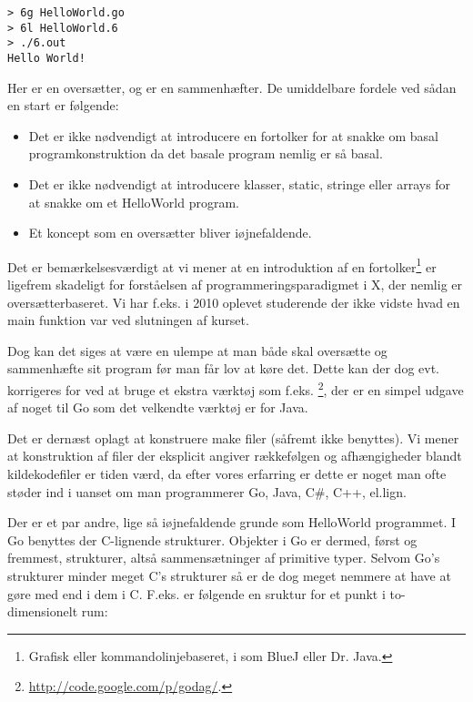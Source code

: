 \begin{verbatim}
> 6g HelloWorld.go
> 6l HelloWorld.6
> ./6.out
Hello World!
\end{verbatim}

Her er  en oversætter, og  er en sammenhæfter. De umiddelbare
fordele ved sådan en start er følgende:

\begin{itemize}

\item Det er ikke nødvendigt at introducere en fortolker for at snakke om basal
programkonstruktion da det basale program nemlig er så basal.

\item Det er ikke nødvendigt at introducere klasser, static, stringe
eller arrays for at snakke om et HelloWorld program.

\item Et koncept som en oversætter bliver iøjnefaldende.

\end{itemize}

Det er bemærkelsesværdigt at vi mener at en introduktion af en
fortolker\footnote{Grafisk eller kommandolinjebaseret, i som BlueJ eller Dr.
Java.} er ligefrem skadeligt for forståelsen af programmeringsparadigmet i X,
der nemlig er oversætterbaseret. Vi har f.eks. i 2010 oplevet studerende der
ikke vidste hvad en main funktion var ved slutningen af kurset.

Dog kan det siges at være en ulempe at man både skal oversætte og sammenhæfte
sit program før man får lov at køre det. Dette kan der dog evt. korrigeres for
ved at bruge et ekstra værktøj som f.eks.
\footnote{\url{http://code.google.com/p/godag/}.}, der er en simpel
udgave af noget til Go som det velkendte værktøj  er for Java.

Det er dernæst oplagt at konstruere make filer (såfremt  ikke
benyttes). Vi mener at konstruktion af filer der eksplicit angiver rækkefølgen
og afhængigheder blandt kildekodefiler er tiden værd, da efter vores erfarring
er dette er noget man ofte støder ind i uanset om man programmerer Go, Java,
C\#, C++, el.lign.

Der er et par andre, lige så iøjnefaldende grunde som HelloWorld programmet.  I
Go benyttes der C-lignende strukturer. Objekter i Go er dermed, først og
fremmest, strukturer, altså sammensætninger af primitive typer. Selvom Go's
strukturer minder meget C's strukturer så er de dog meget nemmere at have at
gøre med end i dem i C. F.eks. er følgende en sruktur for et punkt i
to-dimensionelt rum:

